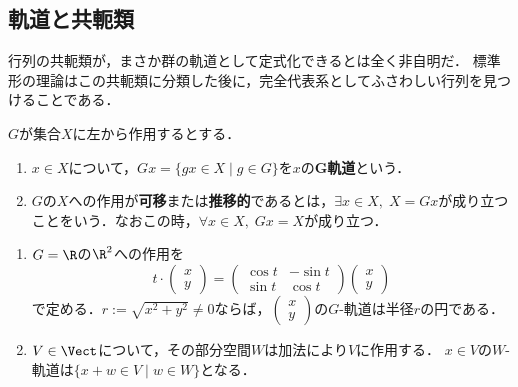 \documentclass[uplatex, dvipdfmx]{jsreport}
\begin{document}
\subsection{軌道と共軛類}

\begin{tcolorbox}[colframe=ForestGreen, colback=ForestGreen!10!white, breakable]
    行列の共軛類が，まさか群の軌道として定式化できるとは全く非自明だ．
    標準形の理論はこの共軛類に分類した後に，完全代表系としてふさわしい行列を見つけることである．
\end{tcolorbox}

\begin{definition}
    $G$が集合$X$に左から作用するとする．
    \begin{enumerate}
        \item $x\in X$について，$Gx=\{gx\in X\mid g\in G\}$を$x$の\textbf{G軌道}という．
        \item $G$の$X$への作用が\textbf{可移}または\textbf{推移的}であるとは，$\exists x\in X,\;X=Gx$が成り立つことをいう．なおこの時，$\forall x\in X,\;Gx=X$が成り立つ．
    \end{enumerate}
\end{definition}

\begin{example}[回転，平行移動]\mbox{}
    \begin{enumerate}
        \item $G=\R$の$\R^2$への作用を
        \[t\cdot\begin{pmatrix}x\\y\end{pmatrix}=\begin{pmatrix}\cos t&-\sin t\\\sin t&\cos t\end{pmatrix}\begin{pmatrix}x\\y\end{pmatrix}\]
        で定める．$r:=\sqrt{x^2+y^2}\ne  0$ならば，$\begin{pmatrix}x\\y\end{pmatrix}$の$G$-軌道は半径$r$の円である．
        \item $V\in\Vect$について，その部分空間$W$は加法により$V$に作用する．
        $x\in V$の$W$-軌道は$\{x+w\in V\mid w\in W\}$となる．
    \end{enumerate}
\end{example}
\end{document}
